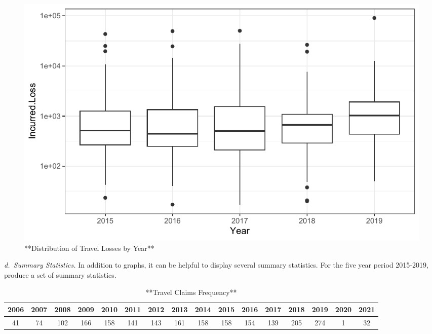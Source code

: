 \documentclass[
]{book}
\newenvironment{Shaded}{\begin{snugshade}}{\end{snugshade}}
\newcommand{\AttributeTok}[1]{\textcolor[rgb]{0.77,0.63,0.00}{#1}}
\newcommand{\CommentTok}[1]{\textcolor[rgb]{0.56,0.35,0.01}{\textit{#1}}}
\newcommand{\FunctionTok}[1]{\textcolor[rgb]{0.00,0.00,0.00}{#1}}
\newcommand{\NormalTok}[1]{#1}
\newcommand{\OtherTok}[1]{\textcolor[rgb]{0.56,0.35,0.01}{#1}}
\newcommand{\SpecialCharTok}[1]{\textcolor[rgb]{0.00,0.00,0.00}{#1}}
\newcommand{\StringTok}[1]{\textcolor[rgb]{0.31,0.60,0.02}{#1}}
\begin{document}
\begin{figure}

{\centering \includegraphics[width=0.6\linewidth]{LossDataAnalytics_files/figure-latex/TravelClaims2-1} 

}

\caption{**Distribution of Travel Losses by Year**}\label{fig:TravelClaims2}
\end{figure}

\emph{d.~Summary Statistics.} In addition to graphs, it can be helpful to display several summary statistics. For the five year period 2015-2019, produce a set of summary statistics.

\begin{Shaded}
\end{Shaded}

\begin{table}

\caption{\label{tab:unnamed-chunk-18}**Travel Claims Frequency**}
\centering
\begin{tabular}[t]{c|c|c|c|c|c|c|c|c|c|c|c|c|c|c|c}
\hline
2006 & 2007 & 2008 & 2009 & 2010 & 2011 & 2012 & 2013 & 2014 & 2015 & 2016 & 2017 & 2018 & 2019 & 2020 & 2021\\
\hline
41 & 74 & 102 & 166 & 158 & 141 & 143 & 161 & 158 & 158 & 154 & 139 & 205 & 274 & 1 & 32\\
\hline
\end{tabular}
\end{table}
\end{document}
